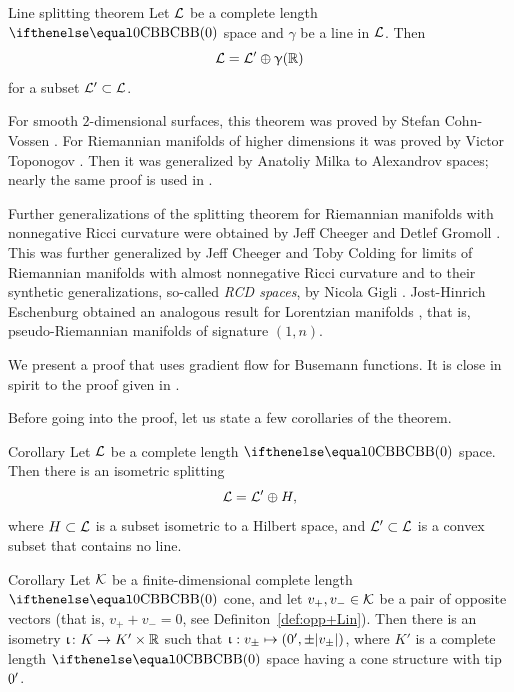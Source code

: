  {\sloppy 

\begin{thm}{Line splitting theorem}\label{thm:splitting}
Let $\mathcal{L}$  be a complete length $\Alex{0}$ space
and $\gamma$ be a line in $\mathcal{L}$. 
Then 
\[\mathcal{L}=\mathcal{L}'\oplus \upgamma(\mathbb{R})\]
for a subset $\spc{L}'\subset \spc{L}$.
\end{thm}

}

For smooth $2$-dimensional surfaces, 
this theorem was proved by Stefan Cohn-Vossen \cite{cohn-vossen_line}.
For Riemannian manifolds of higher dimensions 
it was proved by Victor Toponogov \cite{toponogov-globalization+splitting}.
Then it was generalized by Anatoliy Milka \cite{milka-line}
to Alexandrov spaces; nearly the same proof is used in \cite[1.5]{burago-burago-ivanov}.

Further generalizations of the splitting theorem for Riemannian manifolds with nonnegative Ricci curvature were obtained by Jeff Cheeger and Detlef Gromoll \cite{cheeger-gromoll-split}.
This was further generalized by Jeff Cheeger and Toby Colding for limits of Riemannian manifolds with almost nonnegative Ricci curvature \cite{cheeger-colding-alm-rigidity} and to their synthetic generalizations, so-called {}\emph{RCD spaces}, by Nicola Gigli \cite{gigli2013splitting, gigli-splitting-overview}.
Jost-Hinrich Eschenburg obtained an analogous result for  Lorentzian manifolds \cite{eshenburg-split}, that is, pseudo-Riemannian manifolds of signature $(1,n)$.

We present a proof that uses gradient flow for Busemann functions. 
It is close in spirit to the proof given in \cite{cheeger-gromoll-split}.

Before going into the proof, let us state a few corollaries of the theorem.

\begin{thm}{Corollary}\label{cor:splitting}
Let $\mathcal{L}$ be a complete length $\Alex{0}$ space. 
Then there is an isometric splitting
\[
\mathcal{L}=\mathcal{L}'\oplus H,
\]
where $H\subset \spc{L}$ is a subset isometric to a Hilbert space, and $\spc{L}'\subset \spc{L}$ is a convex subset that contains no line. 
\end{thm}

 {\sloppy 

\begin{thm}{Corollary}\label{cor:splitting-vectors}
Let $\mathcal{K}$ be a finite-dimensional complete length $\Alex0$ cone, and let $v_+,v_-\in \spc{K}$ be a pair of opposite vectors 
(that is, $v_+ + v_-=0$, see Definiton~\ref{def:opp+Lin}).
Then there is an isometry $\iota\:K\to K'\times \RR$ such that
$\iota:v_\pm\mapsto (\0',\pm|v_\pm|)$, where $K'$ is a complete length $\Alex0$ space having a cone structure with tip $0'$.
\end{thm}

}

